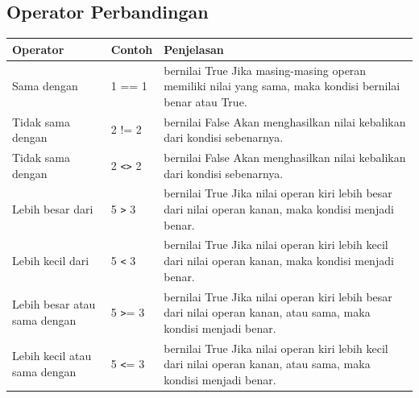 \subsection{Operator Perbandingan}
\begin{center}
\begin{tabular}{ | m{2cm} | m{2cm} | m{7cm} | }
\hline
Operator & Contoh & Penjelasan \\
\hline
Sama dengan & 1 == 1 & bernilai True Jika masing-masing operan memiliki nilai yang sama, maka kondisi bernilai benar atau True. \\
\hline
Tidak sama dengan & 2 != 2 & bernilai False Akan menghasilkan nilai kebalikan dari kondisi sebenarnya. \\
\hline
Tidak sama dengan & 2 \texttt{<>} 2 & bernilai False Akan menghasilkan nilai kebalikan dari kondisi sebenarnya. \\
\hline
Lebih besar dari & 5 \texttt{>} 3 & bernilai True Jika nilai operan kiri lebih besar dari nilai operan kanan, maka kondisi menjadi benar. \\
\hline
Lebih kecil dari & 5 \texttt{<} 3 & bernilai True Jika nilai operan kiri lebih kecil dari nilai operan kanan, maka kondisi menjadi benar. \\
\hline
Lebih besar atau sama dengan & 5 \texttt{>}= 3 & bernilai True Jika nilai operan kiri lebih besar dari nilai operan kanan, atau sama, maka kondisi menjadi benar. \\
\hline
Lebih kecil atau sama dengan & 5 \texttt{<}= 3 & bernilai True Jika nilai operan kiri lebih kecil dari nilai operan kanan, atau sama, maka kondisi menjadi benar. \\
\hline
\end{tabular}
\end{center}


